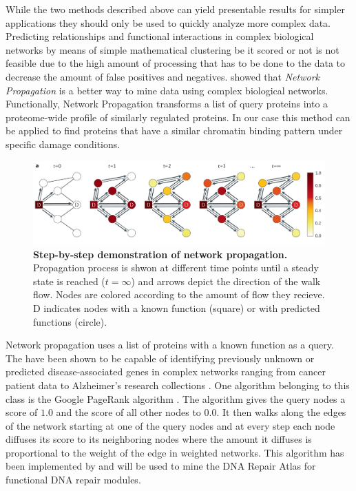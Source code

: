 While the two methods described above can yield presentable results for simpler applications they should only be used to quickly analyze more complex data. Predicting relationships and functional interactions in complex biological networks by means of simple mathematical clustering be it scored or not is not feasible due to the high amount of processing that has to be done to the data to decrease the amount of false positives and negatives. \cite{Cowen.2017} showed that \textit{Network Propagation} is a better way to mine data using complex biological networks. Functionally, Network Propagation transforms a list of query proteins into a proteome-wide profile of similarly regulated proteins. In our case this method can be applied to find proteins that have a similar chromatin binding pattern under specific damage conditions. 
\begin{figure}[H]
    \centering
    \includegraphics[width=\textwidth]{resources/images/Intro/network_propagation.PNG}
    \caption[Step-by-step demonstration of network propagation]{\textbf{Step-by-step demonstration of network propagation. } Propagation process is shwon at different time points until a steady state is reached ($t=\infty$) and arrows depict the direction of the walk flow. Nodes are colored according to the amount of flow they recieve. D indicates nodes with a known function (square) or with predicted functions (circle).\\\citep{Cowen.2017}}
    \label{fig:network_propagation}
\end{figure}
Network propagation uses a list of proteins with a known function as a query. The have been shown to be capable of identifying previously unknown or predicted disease-associated genes in complex networks ranging from cancer patient data to Alzheimer's research collections \citep{Cowen.2017}. One algorithm belonging to this class is the Google PageRank algorithm \citep{TaherHaveliwala.2003}.
The algorithm gives the query nodes a score of $1.0$ and the score of all other nodes to $0.0$. It then walks along the edges of the network starting at one of the query nodes and at every step each node diffuses its score to its neighboring nodes where the amount it diffuses is proportional to the weight of the edge in weighted networks. This algorithm has been implemented by \cite{Menges.2018} and will be used to mine the DNA Repair Atlas for functional DNA repair modules.

